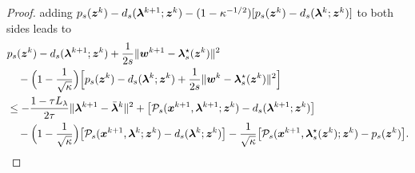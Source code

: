 \begin{proof}
adding \(p_s(\bm{z}^k)-d_s(\bm{\lambda}^{k+1};\bm{z}^k)
-(1-\kappa^{-1/2})[p_s(\bm{z}^k)-d_s(\bm{\lambda}^k;\bm{z}^k)]\) to both sides leads to
\begin{equation}
\label{eq:b2-prime-dual-nesterov}
\begin{aligned}
    &p_s(\bm{z}^k)-d_s(\bm{\lambda}^{k+1};\bm{z}^k)
    +\frac{1}{2s}\|\bm{w}^{k+1}-\bm{\lambda}_s^\star(\bm{z}^k)\|^2\\
    &\quad-\Bigl(1-\frac{1}{\sqrt{\kappa}}\Bigr)
    \Bigl[p_s(\bm{z}^k)-d_s(\bm{\lambda}^k;\bm{z}^k)
    +\frac{1}{2s}\|\bm{w}^k-\bm{\lambda}_s^\star(\bm{z}^k)\|^2\Bigr]\\
    &\le-\frac{1-\tau L_\lambda}{2\tau}\|\bm{\lambda}^{k+1}-\bar{\bm{\lambda}}^k\|^2
    +\bigl[\mathcal P_s(\bm{x}^{k+1},\bm{\lambda}^{k+1};\bm{z}^k)
    -d_s(\bm{\lambda}^{k+1};\bm{z}^k)\bigr]\\
    &\quad-\Bigl(1-\frac{1}{\sqrt{\kappa}}\Bigr)
    \bigl[\mathcal P_s(\bm{x}^{k+1},\bm{\lambda}^k;\bm{z}^k)-d_s(\bm{\lambda}^k;\bm{z}^k)\bigr]
    -\frac{1}{\sqrt{\kappa}}
    \bigl[\mathcal P_s(\bm{x}^{k+1},\bm{\lambda}_s^\star(\bm{z}^k);\bm{z}^k)-p_s(\bm{z}^k)\bigr].
\end{aligned}
\end{equation}


\end{proof}
